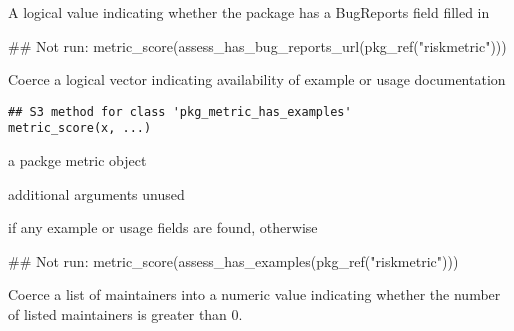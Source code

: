 \documentclass[a4paper]{book}
\begin{document}
%
\begin{Value}
A logical value indicating whether the package has a BugReports field
filled in
\end{Value}
%
\begin{Examples}
\begin{ExampleCode}
## Not run: metric_score(assess_has_bug_reports_url(pkg_ref("riskmetric")))

\end{ExampleCode}
\end{Examples}
%
\begin{Description}
Coerce a logical vector indicating availability of example or usage documentation
\end{Description}
%
\begin{Usage}
\begin{verbatim}
## S3 method for class 'pkg_metric_has_examples'
metric_score(x, ...)
\end{verbatim}
\end{Usage}
%
\begin{Arguments}
\begin{ldescription}
\item[\code{x}] a  packge metric object

\item[\code{...}] additional arguments unused
\end{ldescription}
\end{Arguments}
%
\begin{Value}
 if any example or usage fields are found, otherwise 
\end{Value}
%
\begin{Examples}
\begin{ExampleCode}
## Not run: metric_score(assess_has_examples(pkg_ref("riskmetric")))

\end{ExampleCode}
\end{Examples}
%
\begin{Description}
Coerce a list of maintainers into a numeric value indicating whether the
number of listed maintainers is greater than 0.
\end{Description}
\end{document}
